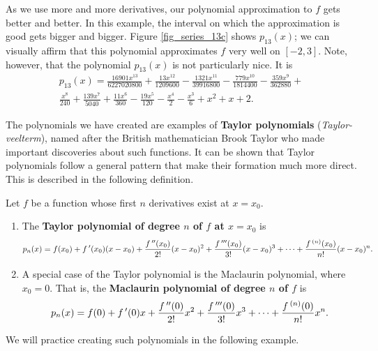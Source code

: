 As we use more and more derivatives, our polynomial approximation to $f$ gets better and better. In this example, the interval on which the approximation is good gets bigger and bigger. Figure \ref{fig_series_13c} shows $p_{13}(x)$; we can visually affirm that this polynomial approximates $f$ very well on $[-2,3]$. Note, however, that the polynomial $p_{13}(x)$ is not particularly nice. It is \begin{multline*}
p_{13}(x)= \frac{16901x^{13}}{6227020800}+\frac{13x^{12}}{1209600}-\frac{1321x^{11}}{39916800}-\frac{779x^{10}}{1814400}-\frac{359x^9}{362880}+\\
\frac{x^8}{240}+\frac{139x^7}{5040}+\frac{11 x^6}{360}-\frac{19x^5}{120}-\frac{x^4}{2}-\frac{x^3}{6}+x^2+x+2.
\end{multline*}

The polynomials we have created are examples of \textbf{Taylor polynomials} (\textit{Taylor-veelterm}), named after the British mathematician Brook Taylor who made important discoveries about such functions. It can be shown that Taylor polynomials follow a general pattern that make their formation much more direct. This is described in the following definition.

\begin{definition}\label{def:taypoly}
Let $f$ be a function whose first $n$ derivatives exist at $x=x_0$.
 
\begin{enumerate}
\item		The \textbf{Taylor polynomial of degree $n$ of $f$ at $x=x_0$} is 
				{$$p_n(x) = f(x_0) + f\,'(x_0)(x-x_0) + \frac{f\,''(x_0)}{2!}(x-x_0)^2+\frac{f\,'''(x_0)}{3!}(x-x_0)^3+\cdots+\frac{f\,^{(n)}(x_0)}{n!}(x-x_0)^n.$$}
\item		A special case of the Taylor polynomial is the Maclaurin polynomial, where $x_0=0$. That is, the \textbf{Maclaurin polynomial of degree $n$ of $f$} is 
{$$p_n(x) = f(0) + f\,'(0)x + \frac{f\,''(0)}{2!}x^2+\frac{f\,'''(0)}{3!}x^3+\cdots+\frac{f\,^{(n)}(0)}{n!}x^n.$$}
\end{enumerate}
\end{definition}

We will practice creating such polynomials in the following example.

